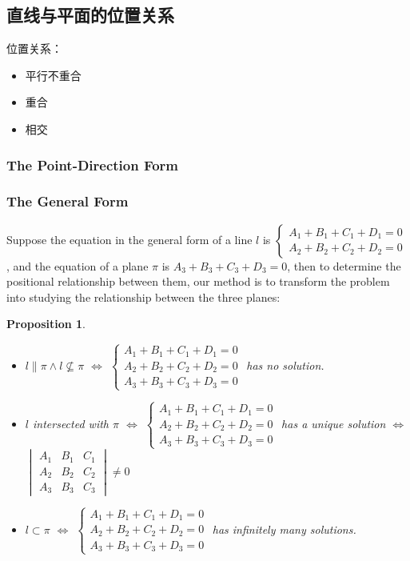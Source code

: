 \documentclass[onecolumn]{ctexart}
\newtheorem{proposition}{Proposition}
\begin{document}
\subsection{直线与平面的位置关系}
位置关系：
\begin{itemize}
  \item 平行不重合
  \item 重合
  \item 相交
\end{itemize}

\subsubsection{The Point-Direction Form}


\subsubsection{The General Form}

Suppose the equation in the general form of a line $l$ is $
\begin{cases}
  A_1 + B_1 + C_1 + D_1 = 0 \\
  A_2 + B_2 + C_2 + D_2 = 0
\end{cases}$, and the equation of a plane $\pi$ is $A_3 + B_3 + C_3 + D_3 = 0$, 
then to determine the positional relationship between them, our method is to 
transform the problem into studying the relationship between the three planes:
\begin{proposition}
  \begin{itemize}
    \item $l \parallel \pi \wedge l \nsubseteq \pi $ $\Leftrightarrow$ $
    \begin{cases}
      A_1 + B_1 + C_1 + D_1 = 0 \\
      A_2 + B_2 + C_2 + D_2 = 0 \\
      A_3 + B_3 + C_3 + D_3 = 0
    \end{cases}$ has no solution.
    \item $l$ intersected with $\pi$ $\Leftrightarrow$ $
    \begin{cases}
      A_1 + B_1 + C_1 + D_1 = 0 \\
      A_2 + B_2 + C_2 + D_2 = 0 \\
      A_3 + B_3 + C_3 + D_3 = 0
    \end{cases}$ has a unique solution $\Leftrightarrow$ $
    \begin{vmatrix}
      A_1 & B_1 & C_1 \\
      A_2 & B_2 & C_2 \\
      A_3 & B_3 & C_3 
    \end{vmatrix} \neq 0$
    \item $l \subset \pi$ $\Leftrightarrow$ $
    \begin{cases}
      A_1 + B_1 + C_1 + D_1 = 0 \\
      A_2 + B_2 + C_2 + D_2 = 0 \\
      A_3 + B_3 + C_3 + D_3 = 0
    \end{cases}$ has infinitely many solutions.
  \end{itemize}
\end{proposition}
\end{document}
